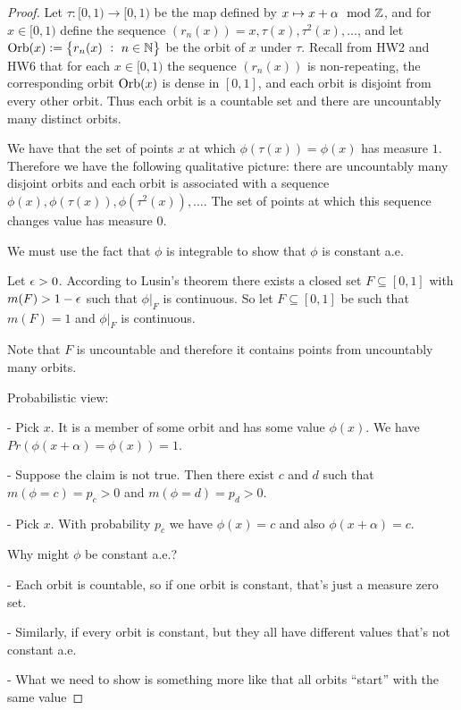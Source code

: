 \begin{proof}
  Let $\tau: [0, 1) \to [0, 1)$ be the map defined by $x \mapsto x + \alpha \mod {\mathbb{Z}}$, and for $x \in [0, 1)$
  define the sequence $(r_n(x)) = x, \tau(x), \tau^2(x), \ldots$, and
  let $\text{Orb}(x) := \big\{r_n(x) ~:~ n \in \mathbb{N}\big\}$ be the orbit of $x$ under $\tau$. Recall from HW2 and HW6
  that for each $x \in [0, 1)$ the sequence $(r_n(x))$ is non-repeating, the corresponding orbit $\text{Orb}(x)$ is
  dense in $[0, 1]$, and each orbit is disjoint from every other orbit. Thus each orbit is a countable set and
  there are uncountably many distinct orbits.

  We have that the set of points $x$ at which $\phi(\tau(x)) = \phi(x)$ has measure $1$. Therefore we have the
  following qualitative picture: there are uncountably many disjoint orbits and each orbit is associated with a
  sequence $\phi(x), \phi(\tau(x)), \phi(\tau^2(x)), \ldots$. The set of points at which this sequence changes
  value has measure $0$.

  We must use the fact that $\phi$ is integrable to show that $\phi$ is constant a.e.

  Let $\epsilon > 0$. According to Lusin's theorem there exists a closed set $F \subseteq [0, 1]$
  with $m(F) > 1- \epsilon$ such that $\phi|_F$ is continuous. So let $F \subseteq [0, 1]$ be such that $m(F) = 1$
  and $\phi|_F$ is continuous.

  Note that $F$ is uncountable and therefore it contains points from uncountably many orbits.


  Probabilistic view:

  - Pick $x$. It is a member of some orbit and has some value $\phi(x)$. We have $Pr(\phi(x + \alpha) = \phi(x)) = 1$.

  - Suppose the claim is not true. Then there exist $c$ and $d$ such that $m(\phi = c) = p_c > 0$ and $m(\phi = d) = p_d > 0$.

  - Pick $x$. With probability $p_c$ we have $\phi(x) = c$ and also $\phi(x + \alpha) = c$.










  Why might $\phi$ be constant a.e.?

  - Each orbit is countable, so if one orbit is constant, that's just a measure zero set.

  - Similarly, if every orbit is constant, but they all have different values that's not constant a.e.

  - What we need to show is something more like that all orbits ``start​'' with the same value

\end{proof}



